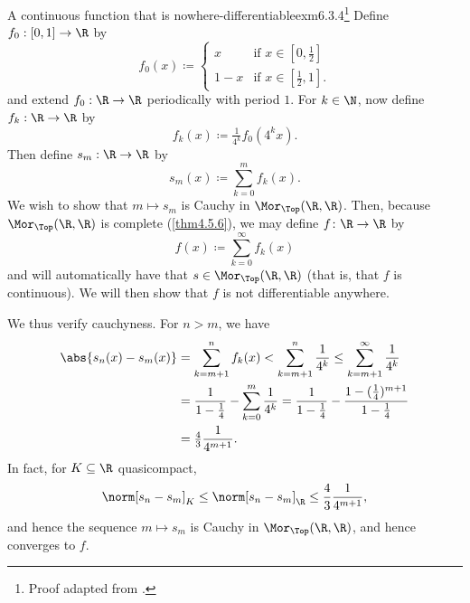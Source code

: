 \begin{exm}{A continuous function that is nowhere-differentiable}{exm6.3.4}\footnote{Proof adapted from \cite{Coleman}.}
Define $f_0:[0,1]\rightarrow \R$ by
\begin{equation}
f_0(x)\coloneqq \begin{cases}x & \text{if }x\in [0,\tfrac{1}{2}] \\ 1-x & \text{if }x\in [\tfrac{1}{2},1].\end{cases}
\end{equation}
and extend $f_0:\R \rightarrow \R$ periodically with period $1$.  For $k\in \N$, now define $f_k:\R \rightarrow \R$ by
\begin{equation}
f_k(x)\coloneqq \tfrac{1}{4^k}f_0(4^kx).
\end{equation}
Then define $s_m:\R \rightarrow \R$ by
\begin{equation}
s_m(x)\coloneqq \sum _{k=0}^mf_k(x).
\end{equation}
We wish to show that $m\mapsto s_m$ is Cauchy in $\Mor _{\Top}(\R,\R )$.    Then, because $\Mor _{\Top}(\R ,\R )$ is complete (\cref{thm4.5.6}), we may define $f\colon \R \rightarrow \R$ by
\begin{equation}
f(x)\coloneqq \sum _{k=0}^\infty f_k(x)
\end{equation}
and will automatically have that $s\in \Mor _{\Top}(\R ,\R )$ (that is, that $f$ is continuous).  We will then show that $f$ is not differentiable anywhere.

We thus verify cauchyness.  For $n>m$, we have
\begin{equation}
\begin{split}
\abs{s_n(x)-s_m(x)} & =\sum _{k=m+1}^nf_k(x)<\sum _{k=m+1}^n\frac{1}{4^k}\leq \sum _{k=m+1}^\infty \frac{1}{4^k} \\
& =\frac{1}{1-\tfrac{1}{4}}-\sum _{k=0}^m\frac{1}{4^k}=\frac{1}{1-\tfrac{1}{4}}-\frac{1-(\tfrac{1}{4})^{m+1}}{1-\tfrac{1}{4}} \\
& =\tfrac{4}{3}\frac{1}{4^{m+1}}.
\end{split}
\end{equation}
In fact, for $K\subseteq \R$ quasicompact,
\begin{equation}
\norm[s_n-s_m]_K\leq \norm[s_n-s_m]_{\R}\leq \frac{4}{3}\frac{1}{4^{m+1}},
\end{equation}
and hence the sequence $m\mapsto s_m$ is Cauchy in $\Mor _{\Top}(\R ,\R )$, and hence converges to $f$.


\end{exm}
